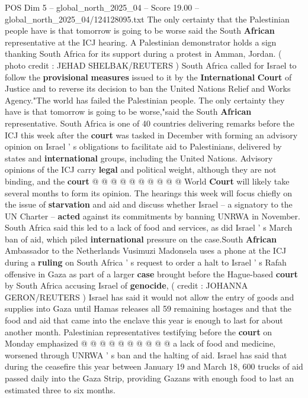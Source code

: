 \begin{textsample}{POS Dim 5 – global\_north\_2025\_04 – Score 19.00 – global\_north\_2025\_04/124128095.txt}  \label{ex:f5_pos_102}
The only certainty that the Palestinian people have is that tomorrow is going to be worse said the South \textbf{African} representative at the ICJ hearing.
A Palestinian demonstrator holds a sign thanking South Africa for its support during a protest in Amman, Jordan. ( photo credit : JEHAD SHELBAK/REUTERS ) South Africa called for Israel to follow the \textbf{provisional} \textbf{measures} issued to it by the \textbf{International} \textbf{Court} of Justice and to reverse its decision to ban the United Nations Relief and Works Agency."The world has failed the Palestinian people.
The only certainty they have is that tomorrow is going to be worse,"said the South \textbf{African} representative.
South Africa is one of 40 countries delivering remarks before the ICJ this week after the \textbf{court} was tasked in December with forming an advisory opinion on Israel ' s obligations to facilitate aid to Palestinians, delivered by states and \textbf{international} groups, including the United Nations.
Advisory opinions of the ICJ carry \textbf{legal} and political weight, although they are not binding, and the \textbf{court} @ @ @ @ @ @ @ @ @ @ World \textbf{Court} will likely take several months to form its opinion.
The hearings this week will focus chiefly on the issue of \textbf{starvation} and aid and discuss whether Israel -- a signatory to the UN Charter -- \textbf{acted} against its commitments by banning UNRWA in November.
South Africa said this led to a lack of food and services, as did Israel ' s March ban of aid, which piled \textbf{international} pressure on the case.South \textbf{African} Ambassador to the Netherlands Vusimuzi Madonsela uses a phone at the ICJ during a \textbf{ruling} on South Africa ' s request to order a halt to Israel ' s Rafah offensive in Gaza as part of a larger \textbf{case} brought before the Hague-based \textbf{court} by South Africa accusing Israel of \textbf{genocide}, ( credit : JOHANNA GERON/REUTERS ) Israel has said it would not allow the entry of goods and supplies into Gaza until Hamas releases all 59 remaining hostages and that the food and aid that came into the enclave this year is enough to last for about another month.
Palestinian representatives testifying before the \textbf{court} on Monday emphasized @ @ @ @ @ @ @ @ @ @ a lack of food and medicine, worsened through UNRWA ' s ban and the halting of aid.
Israel has said that during the ceasefire this year between January 19 and March 18, 600 trucks of aid passed daily into the Gaza Strip, providing Gazans with enough food to last an estimated three to six months.

\end{textsample}
